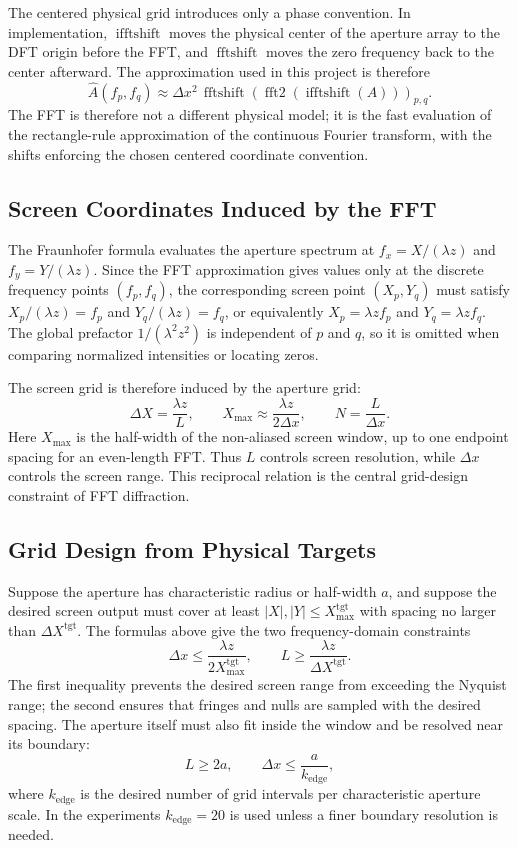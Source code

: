 \documentclass[12pt]{article}
\begin{document}
The centered physical grid introduces only a phase convention. In implementation, \(\operatorname{ifftshift}\)
moves the physical center of the aperture array to the DFT origin before the FFT, and
\(\operatorname{fftshift}\) moves the zero frequency back to the center afterward. The approximation used in
this project is therefore
\[
    \hat{A}(f_p,f_q)\approx \Delta x^2\,
    \operatorname{fftshift}\!\left(
        \operatorname{fft2}\!\left(\operatorname{ifftshift}(A)\right)
    \right)_{p,q}.
\]
The FFT is therefore not a different physical model; it is the fast evaluation of the rectangle-rule
approximation of the continuous Fourier transform, with the shifts enforcing the chosen centered
coordinate convention.

\subsection{Screen Coordinates Induced by the FFT}

The Fraunhofer formula evaluates the aperture spectrum at \(f_x=X/(\lambda z)\) and
\(f_y=Y/(\lambda z)\). Since the FFT approximation gives values only at the discrete frequency points
\((f_p,f_q)\), the corresponding screen point \((X_p,Y_q)\) must satisfy
\(X_p/(\lambda z)=f_p\) and \(Y_q/(\lambda z)=f_q\), or equivalently
\(X_p=\lambda z f_p\) and \(Y_q=\lambda z f_q\). The global prefactor \(1/(\lambda^2z^2)\) is independent
of \(p\) and \(q\), so it is omitted when comparing normalized intensities or locating zeros.

The screen grid is therefore induced by the aperture grid:
\[
    \Delta X=\frac{\lambda z}{L},\qquad
    X_{\max}\approx \frac{\lambda z}{2\Delta x},\qquad
    N=\frac{L}{\Delta x}.
\]
Here \(X_{\max}\) is the half-width of the non-aliased screen window, up to one endpoint spacing for an
even-length FFT. Thus \(L\) controls screen resolution, while \(\Delta x\) controls the screen range. This
reciprocal relation is the central grid-design constraint of FFT diffraction.

\subsection{Grid Design from Physical Targets}

Suppose the aperture has characteristic radius or half-width \(a\), and suppose the desired screen output
must cover at least \(|X|,|Y|\leq X_{\max}^{\mathrm{tgt}}\) with spacing no larger than
\(\Delta X^{\mathrm{tgt}}\). The formulas above give the two frequency-domain constraints
\[
    \Delta x\leq \frac{\lambda z}{2X_{\max}^{\mathrm{tgt}}},\qquad
    L\geq \frac{\lambda z}{\Delta X^{\mathrm{tgt}}}.
\]
The first inequality prevents the desired screen range from exceeding the Nyquist range; the second ensures
that fringes and nulls are sampled with the desired spacing. The aperture itself must also fit inside the
window and be resolved near its boundary:
\[
    L\geq 2a,\qquad
    \Delta x\leq \frac{a}{k_{\mathrm{edge}}},
\]
where \(k_{\mathrm{edge}}\) is the desired number of grid intervals per characteristic aperture scale. In
the experiments \(k_{\mathrm{edge}}=20\) is used unless a finer boundary resolution is needed.
\end{document}
